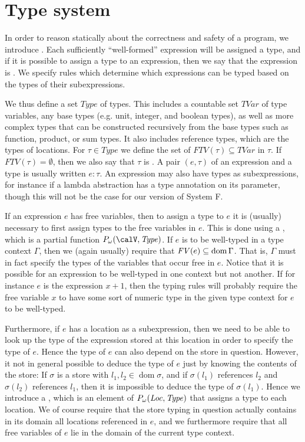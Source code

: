 \documentclass[a4paper, 11pt, article, danish, oneside]{memoir}
\DeclarePairedDelimiter{\auxdelimparen}{(}{)}
\newcommand{\dom}{\operatorname{dom}}
\newcommand{\setVar}{\calV}
\newcommand{\setTVar}{\mathit{TVar}}
\newcommand{\setLoc}{\mathit{Loc}}
\newcommand{\setType}{\mathit{Type}}
\newcommand{\freevar}[2][]{\mathit{FV}\auxdelimparen[#1]{#2}}
\newcommand{\freeTvar}[1]{\mathit{FTV}(#1)}
\newcommand{\pmaps}[3][]{%
    \ifstrempty{#1}%
        {%
            P(#2,#3)
        }{%
            P_{#1}(#2,#3)
        }%
}
\begin{document}
\section{Type system}

In order to reason statically about the correctness and safety of a program, we introduce . Each sufficiently \enquote{well-formed} expression will be assigned a type, and if it is possible to assign a type to an expression, then we say that the expression is . We specify rules which determine which expressions can be typed based on the types of their subexpressions.

We thus define a set $\setType$ of types. This includes a countable set $\setTVar$ of type variables, any base types (e.g. unit, integer, and boolean types), as well as more complex types that can be constructed recursively from the base types such as function, product, or sum types. It also includes reference types, which are the types of locations. For $\tau \in \setType$ we define the set of  $\freeTvar{\tau} \subseteq \setTVar$ in $\tau$. If $\freeTvar{\tau} = \emptyset$, then we also say that $\tau$ is . A pair $(e,\tau)$ of an expression and a type is usually written $e : \tau$. An expression may also have types as subexpressions, for instance if a lambda abstraction has a type annotation on its parameter, though this will not be the case for our version of System F.

If an expression $e$ has free variables, then to assign a type to $e$ it is (usually) necessary to first assign types to the free variables in $e$. This is done using a , which is a partial function $\pmaps[\omega]{\setVar}{\setType}$. If $e$ is to be well-typed in a type context $\Gamma$, then we (again usually) require that $\freevar{e} \subseteq \dom \Gamma$. That is, $\Gamma$ must in fact specify the types of the variables that occur free in $e$. Notice that it is possible for an expression to be well-typed in one context but not another. If for instance $e$ is the expression $x + 1$, then the typing rules will probably require the free variable $x$ to have some sort of numeric type in the given type context for $e$ to be well-typed.

Furthermore, if $e$ has a location as a subexpression, then we need to be able to look up the type of the expression stored at this location in order to specify the type of $e$. Hence the type of $e$ can also depend on the store in question. However, it not in general possible to deduce the type of $e$ just by knowing the contents of the store: If $\sigma$ is a store with $l_1,l_2 \in \dom \sigma$, and if $\sigma(l_1)$ references $l_2$ and $\sigma(l_2)$ references $l_1$, then it is impossible to deduce the type of $\sigma(l_1)$. Hence we introduce a , which is an element of $\pmaps[\omega]{\setLoc}{\setType}$ that assigns a type to each location. We of course require that the store typing in question actually contains in its domain all locations referenced in $e$, and we furthermore require that all free variables of $e$ lie in the domain of the current type context.
\end{document}
